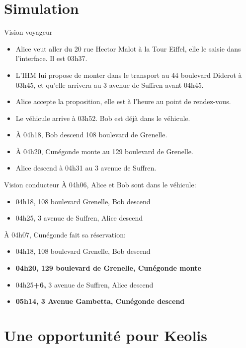 \documentclass[table]{beamer}
\begin{document}
\section{Simulation}

\begin{frame}{Vision voyageur}

  \begin{itemize}[<+->]
  \item Alice veut aller du 20 rue Hector Malot à la Tour Eiffel, elle
    le saisie dans l'interface. Il est 03h37.
  \item L'IHM lui propose de monter dans le transport au 44 boulevard
    Diderot à 03h45, et qu'elle arrivera au 3 avenue de Suffren avant
    04h45.
  \item Alice accepte la proposition, elle est à l'heure au point de
    rendez-vous.
  \item Le véhicule arrive à 03h52. Bob est déjà dans le véhicule.
  \item À 04h18, Bob descend 108 boulevard de Grenelle.
  \item À 04h20, Cunégonde monte au 129 boulevard de Grenelle.
  \item Alice descend à 04h31 au 3 avenue de Suffren.
  \end{itemize}
\end{frame}

\begin{frame}[allowframebreaks]{Vision conducteur}
  À 04h06, Alice et Bob sont dans le véhicule:
  \begin{itemize}
  \item 04h18, 108 boulevard Grenelle, Bob descend
  \item 04h25, 3 avenue de Suffren, Alice descend
  \end{itemize}\framebreak

  À 04h07, Cunégonde fait sa réservation:
  \begin{itemize}
  \item 04h18, 108 boulevard Grenelle, Bob descend
  \item \textbf{04h20, 129 boulevard de Grenelle, Cunégonde monte}
  \item 04h25\textbf{+6,} 3 avenue de Suffren, Alice descend
  \item \textbf{05h14, 3 Avenue Gambetta, Cunégonde descend}
  \end{itemize}
\end{frame}

\section{Une opportunité pour Keolis}
\end{document}
